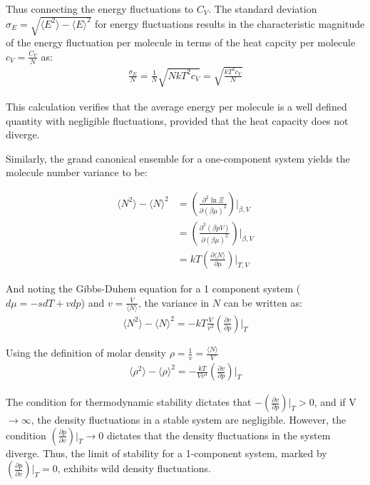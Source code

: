 \documentclass[book.tex]{subfiles}
\begin{document}
Thus connecting the energy fluctuations to $C_{V}$. The standard deviation $\sigma_{E} = \sqrt{\langle E^{2} \rangle - \langle E \rangle^{2}}$ for energy fluctuations results in the characteristic magnitude of the energy fluctuation per molecule in terms of the heat capcity per molecule $c_{V} = \frac{C_{V}}{N}$ as:
\begin{align}\label{Eq2}
\frac{\sigma_{E}}{N} = \frac{1}{N}\sqrt{NkT^{2}c_{V}} = \sqrt{\frac{kT^{2}c_{V}}{N}} 
\end{align}

This calculation verifies that the average energy per molecule is a well defined quantity with negligible fluctuations, provided that the heat capacity does not diverge. 

Similarly, the grand canonical ensemble for a one-component system yields the molecule number variance to be:

\begin{align}\label{Eq3}
\langle N^{2} \rangle - \langle N \rangle^{2} &= \left(\frac{\partial ^{2}\ln \Xi}{\partial (\beta\mu)^{2}}\right)\bigg|_{\beta,V} \\
&= \left(\frac{\partial ^{2} (\beta pV)}{\partial (\beta\mu)^{2}}\right)\bigg|_{\beta,V} \\
&= kT\left(\frac{\partial \langle N \rangle}{\partial \mu}\right)\bigg|_{T,V}
\end{align}

And noting the Gibbs-Duhem equation for a 1 component system ($d\mu=-sdT+vdp$) and $v = \frac{V}{\langle N \rangle}$, the variance in $N$ can be written as:
\begin{align}\label{Eq4}
\langle N^{2} \rangle - \langle N \rangle^{2} = -kT\frac{V}{v^{3}} \left(\frac{\partial v}{\partial p}\right)\bigg|_{T}
\end{align}

Using the definition of molar density $\rho=\frac{1}{v}=\frac{\langle N \rangle}{V}$
\begin{align}\label{Eq5}
\langle \rho^{2} \rangle - \langle \rho \rangle^{2} = -\frac{kT}{Vv^{3}} \left(\frac{\partial v}{\partial p}\right)\bigg|_{T}
\end{align}

The condition for thermodynamic stability dictates that $-\left(\frac{\partial v}{\partial p}\right)\bigg|_{T} > 0$, and if V $\rightarrow\infty$, the density fluctuations in a stable system are negligible. However, the condition $\left(\frac{\partial p}{\partial v}\right)\bigg|_{T} \rightarrow 0$ dictates that the density fluctuations in the system diverge. Thus, the limit of stability for a 1-component system, marked by $\left(\frac{\partial p}{\partial v}\right)\bigg|_{T} = 0$, exhibits wild density fluctuations.
\end{document}
